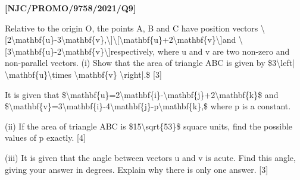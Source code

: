 \item \textbf{{[}NJC/PROMO/9758/2021/Q9{]}} 

Relative to the origin O, the points A, B and C have position vectors
\textbackslash{[}2\textbackslash mathbf\{u\}-3\textbackslash mathbf\{v\},\textbackslash{]}\textbackslash{[}\textbackslash mathbf\{u\}+2\textbackslash mathbf\{v\}\textbackslash{]}and
\textbackslash{[}3\textbackslash mathbf\{u\}-2\textbackslash mathbf\{v\}\textbackslash{]}respectively,
where u and v are two non-zero and non-parallel vectors. (i) Show
that the area of triangle ABC is given by \$3\textbackslash left|
\textbackslash mathbf\{u\}\textbackslash times \textbackslash mathbf\{v\}
\textbackslash right|.\$ {[}3{]}

It is given that \$\textbackslash mathbf\{u\}=2\textbackslash mathbf\{i\}-\textbackslash mathbf\{j\}+2\textbackslash mathbf\{k\}\$
and \$\textbackslash mathbf\{v\}=3\textbackslash mathbf\{i\}-4\textbackslash mathbf\{j\}-p\textbackslash mathbf\{k\},\$
where p is a constant. 

(ii) If the area of triangle ABC is \$15\textbackslash sqrt\{53\}\$
square units, find the possible values of p exactly. {[}4{]}

(iii) It is given that the angle between vectors u and v is acute.
Find this angle, giving your answer in degrees. Explain why there
is only one answer. {[}3{]}
